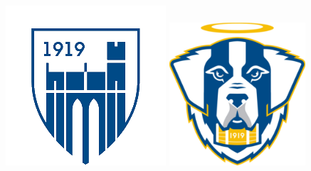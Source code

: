 \documentclass[letterpaper,]{article}
\begin{document}
\begin{center}
    \href{https://www.emmanuel.edu/academics/academic-study/schools/school-business-management/undergraduate-programs/economics/finance}{\includegraphics[scale=0.18]{emmanuel_badge_transparent.png}}
    \href{https://www.goecsaints.com/sports/m-volley/2023-24/roster?fbclid=IwZXh0bgNhZW0CMTAAAR1BNVivBPFXwbOnF0Or9-soHdK9oZpkIlVMOkQCKcvJAdITIKqFqxbJQVs_aem_AWWyeZeu-n9J8rkD5-lNwZaIXUJtoKfKY4K3m-vu2l1DcCKM-mdDvC9JsHp7QImKCABa0u0L1RcDO4bvdM66DGxy}{\includegraphics[scale=0.18]{Emmanuel_mascot_logo.png}}
\end{center}
\end{document}

